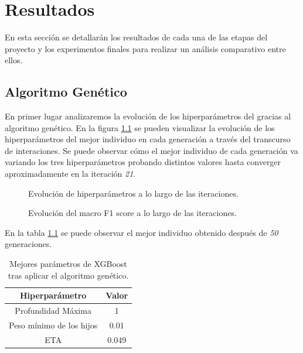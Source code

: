
\chapter{Resultados}
\label{resultados}



  En esta sección se detallarán los resultados de cada una de las etapas del proyecto y los experimentos finales para realizar un análisis comparativo entre ellos.


\section{Algoritmo Genético}

  En primer lugar analizaremos la evolución de los hiperparámetros del  gracias al algoritmo genético. En la figura \ref{EvolucionHiperparametrosImage} se pueden visualizar la evolución de los hiperparámetros del mejor individuo en cada generación a través del transcurso de interaciones. Se puede observar cómo el mejor individuo de cada generación va variando los tres hiperparámetros probando distintos valores hasta converger aproximadamente en la iteración \textit{21}.

  \begin{figure}[H]
      \centering
      
      \caption{Evolución de hiperparámetros a lo largo de las iteraciones.}
      \label{EvolucionHiperparametrosImage}
   \end{figure}

  \begin{figure}[H]
      \centering
      
      \caption{Evolución del macro F1 score a lo largo de las iteraciones.}
      \label{EvolucionF1ScoreImage}
   \end{figure}

  En la tabla \ref{BestGASolutionTable} se puede observar el mejor individuo obtenido después de \textit{50} generaciones.

  \begin{table}[H]
      \centering
          \begin{tabular}{ |c|c| } 
              \hline
              \textbf{Hiperparámetro} & \textbf{Valor}\\
              \hline
                  Profundidad Máxima & 1 \\
                  Peso mínimo de los hijos & 0.01 \\ 
                  ETA & 0.049 \\ 
              \hline

          \end{tabular}
      \caption{Mejores parámetros de XGBoost tras aplicar el algoritmo genético.}
      \label{BestGASolutionTable}
  \end{table}

